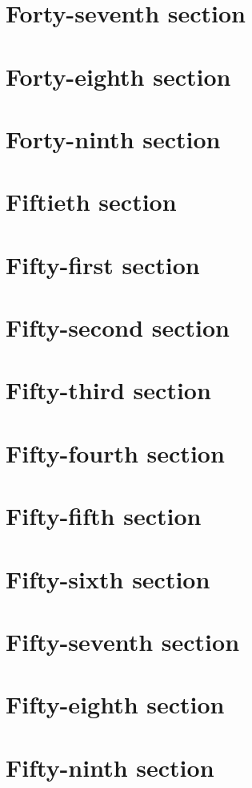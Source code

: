 \documentclass[oneside]{book}
\begin{document}
\begin{multicols}{2}
\section{Forty-seventh section}   
\section{Forty-eighth section}    
\section{Forty-ninth section}     
\section{Fiftieth section}        
\section{Fifty-first section}     
\section{Fifty-second section}    
\section{Fifty-third section}     
\section{Fifty-fourth section}    
\section{Fifty-fifth section}     
\section{Fifty-sixth section}     
\section{Fifty-seventh section}   
\section{Fifty-eighth section}    
\section{Fifty-ninth section}     
\end{multicols}
\clearpage
\end{document}
